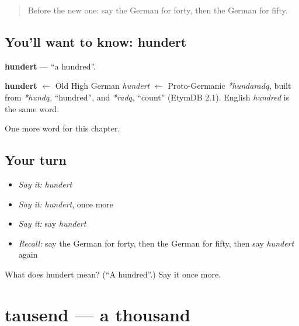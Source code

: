 \label{lesson:GE-C101-hundert}



\begin{quote}
Before the new one: say the German for forty, then the German for fifty.
\end{quote}

\subsection*{You'll want to know: hundert}
\textbf{hundert} — \textquotedblleft{}a hundred\textquotedblright{}.

\begin{cousinweb}
\textbf{hundert} $\leftarrow$ Old High German \emph{hundert} $\leftarrow$ Proto-Germanic \emph{*hundaradą}, built from \emph{*hundą}, \textquotedblleft{}hundred\textquotedblright{}, and \emph{*radą}, \textquotedblleft{}count\textquotedblright{} (EtymDB 2.1). English \emph{hundred} is the same word.
\end{cousinweb}

\begin{grammarlens}[title={What you've built}]
One more word for this chapter.
\end{grammarlens}

\subsection*{Your turn}
\begin{itemize}
\raggedright
  \item \emph{Say it:} \emph{hundert}
  \item \emph{Say it:} \emph{hundert}, once more
  \item \emph{Say it:} say \emph{hundert}
  \item \emph{Recall:} say the German for forty, then the German for fifty, then say \emph{hundert} again
\end{itemize}

\begin{tcolorbox}[breakable,colback=teal!4,colframe=teal!35!black,title={Before you move on}]
What does hundert mean? (\textquotedblleft{}A hundred\textquotedblright{}.) Say it once more.
\end{tcolorbox}
\section[tausend]{tausend — a thousand}

\label{lesson:GE-C101-tausend}



